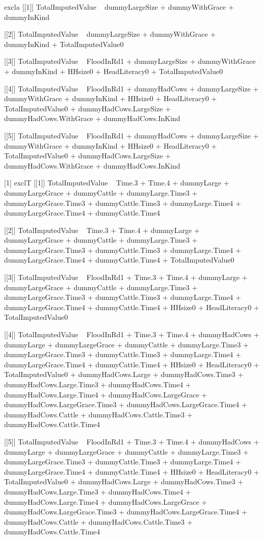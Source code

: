 \begin{Schunk}
\begin{Soutput}
[1] excla
[[1]]
TotalImputedValue ~ dummyLargeSize + dummyWithGrace + dummyInKind

[[2]]
TotalImputedValue ~ dummyLargeSize + dummyWithGrace + dummyInKind + 
    TotalImputedValue0

[[3]]
TotalImputedValue ~ FloodInRd1 + dummyLargeSize + dummyWithGrace + 
    dummyInKind + HHsize0 + HeadLiteracy0 + TotalImputedValue0

[[4]]
TotalImputedValue ~ FloodInRd1 + dummyHadCows + dummyLargeSize + 
    dummyWithGrace + dummyInKind + HHsize0 + HeadLiteracy0 + 
    TotalImputedValue0 + dummyHadCows.LargeSize + dummyHadCows.WithGrace + 
    dummyHadCows.InKind

[[5]]
TotalImputedValue ~ FloodInRd1 + dummyHadCows + dummyLargeSize + 
    dummyWithGrace + dummyInKind + HHsize0 + HeadLiteracy0 + 
    TotalImputedValue0 + dummyHadCows.LargeSize + dummyHadCows.WithGrace + 
    dummyHadCows.InKind

[1] exclT
[[1]]
TotalImputedValue ~ Time.3 + Time.4 + dummyLarge + dummyLargeGrace + 
    dummyCattle + dummyLarge.Time3 + dummyLargeGrace.Time3 + 
    dummyCattle.Time3 + dummyLarge.Time4 + dummyLargeGrace.Time4 + 
    dummyCattle.Time4

[[2]]
TotalImputedValue ~ Time.3 + Time.4 + dummyLarge + dummyLargeGrace + 
    dummyCattle + dummyLarge.Time3 + dummyLargeGrace.Time3 + 
    dummyCattle.Time3 + dummyLarge.Time4 + dummyLargeGrace.Time4 + 
    dummyCattle.Time4 + TotalImputedValue0

[[3]]
TotalImputedValue ~ FloodInRd1 + Time.3 + Time.4 + dummyLarge + 
    dummyLargeGrace + dummyCattle + dummyLarge.Time3 + dummyLargeGrace.Time3 + 
    dummyCattle.Time3 + dummyLarge.Time4 + dummyLargeGrace.Time4 + 
    dummyCattle.Time4 + HHsize0 + HeadLiteracy0 + TotalImputedValue0

[[4]]
TotalImputedValue ~ FloodInRd1 + Time.3 + Time.4 + dummyHadCows + 
    dummyLarge + dummyLargeGrace + dummyCattle + dummyLarge.Time3 + 
    dummyLargeGrace.Time3 + dummyCattle.Time3 + dummyLarge.Time4 + 
    dummyLargeGrace.Time4 + dummyCattle.Time4 + HHsize0 + HeadLiteracy0 + 
    TotalImputedValue0 + dummyHadCows.Large + dummyHadCows.Time3 + 
    dummyHadCows.Large.Time3 + dummyHadCows.Time4 + dummyHadCows.Large.Time4 + 
    dummyHadCows.LargeGrace + dummyHadCows.LargeGrace.Time3 + 
    dummyHadCows.LargeGrace.Time4 + dummyHadCows.Cattle + dummyHadCows.Cattle.Time3 + 
    dummyHadCows.Cattle.Time4

[[5]]
TotalImputedValue ~ FloodInRd1 + Time.3 + Time.4 + dummyHadCows + 
    dummyLarge + dummyLargeGrace + dummyCattle + dummyLarge.Time3 + 
    dummyLargeGrace.Time3 + dummyCattle.Time3 + dummyLarge.Time4 + 
    dummyLargeGrace.Time4 + dummyCattle.Time4 + HHsize0 + HeadLiteracy0 + 
    TotalImputedValue0 + dummyHadCows.Large + dummyHadCows.Time3 + 
    dummyHadCows.Large.Time3 + dummyHadCows.Time4 + dummyHadCows.Large.Time4 + 
    dummyHadCows.LargeGrace + dummyHadCows.LargeGrace.Time3 + 
    dummyHadCows.LargeGrace.Time4 + dummyHadCows.Cattle + dummyHadCows.Cattle.Time3 + 
    dummyHadCows.Cattle.Time4


\end{Soutput}
\end{Schunk}
